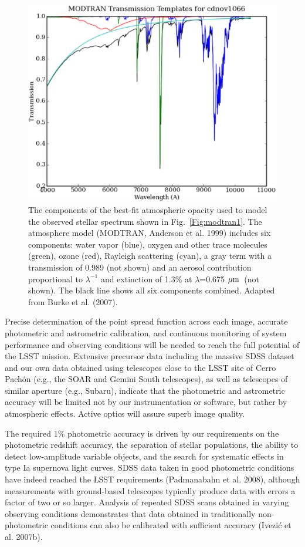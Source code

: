 \documentclass{emulateapj}
\def\mic              {\hbox{$\mu{\rm m}$}}
\begin{document}
\begin{figure}
\includegraphics[width=1.0\hsize,clip]{modtran2.ps}
\caption{The components of the best-fit atmospheric opacity used to
model the observed stellar spectrum shown in Fig.~\ref{Fig:modtran1}.
The atmosphere model (MODTRAN, Anderson et al. 1999) includes six
components: water vapor (blue), oxygen and other trace molecules
(green), ozone (red), Rayleigh scattering (cyan), a gray term
with a transmission of 0.989 (not shown) and an aerosol contribution
proportional to $\lambda^{-1}$ and extinction of 1.3\% at $\lambda$=0.675 \mic\
(not shown). The black line shows all six components combined.
Adapted from Burke et al. (2007).}
\label{Fig:modtran2}
\end{figure}


Precise determination of the point spread function across each image, 
accurate photometric and astrometric calibration, and continuous monitoring 
of system performance and observing conditions will be needed to reach the 
full potential of the LSST mission. Extensive precursor data including the 
massive SDSS dataset and our own data obtained using telescopes close to 
the LSST site of Cerro Pach\'{o}n (e.g., the SOAR and Gemini South telescopes), 
as well as telescopes of similar aperture (e.g., Subaru), indicate that the 
photometric and astrometric accuracy will be limited not by our instrumentation 
or software, but rather by atmospheric effects. Active optics will assure 
superb image quality. 

The required 1\% photometric accuracy is driven by our requirements 
on the photometric redshift accuracy, the separation of stellar populations, 
the ability to detect low-amplitude variable objects, and the search for 
systematic effects in type Ia supernova light curves. SDSS data 
taken in good photometric conditions have indeed reached the LSST requirements
(Padmanabahn et al. 2008), although measurements with ground-based telescopes 
typically produce data with errors a factor of two or so larger. Analysis of
repeated SDSS scans obtained in varying observing conditions demonstrates that data
obtained in traditionally non-photometric conditions can also be calibrated with
sufficient accuracy (Ivezi\'{c} et al. 2007b). 
\end{document}

